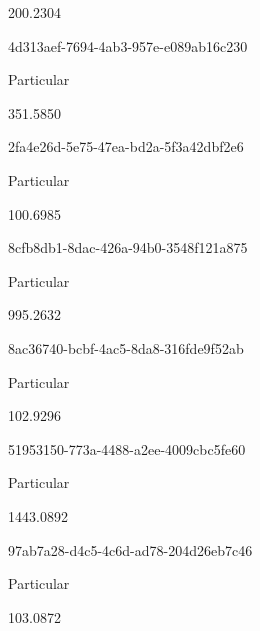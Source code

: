 \documentclass[
  11pt,
  a4paper,
  DIV=11,
  numbers=noendperiod]{scrartcl}
\begin{document}
200.2304

\n    

\n    

\n      

4d313aef-7694-4ab3-957e-e089ab16c230

\n      

Particular

\n      

351.5850

\n    

\n    

\n      

2fa4e26d-5e75-47ea-bd2a-5f3a42dbf2e6

\n      

Particular

\n      

100.6985

\n    

\n    

\n      

8cfb8db1-8dac-426a-94b0-3548f121a875

\n      

Particular

\n      

995.2632

\n    

\n    

\n      

8ac36740-bcbf-4ac5-8da8-316fde9f52ab

\n      

Particular

\n      

102.9296

\n    

\n    

\n      

51953150-773a-4488-a2ee-4009cbc5fe60

\n      

Particular

\n      

1443.0892

\n    

\n    

\n      

97ab7a28-d4c5-4c6d-ad78-204d26eb7c46

\n      

Particular

\n      

103.0872
\end{document}
